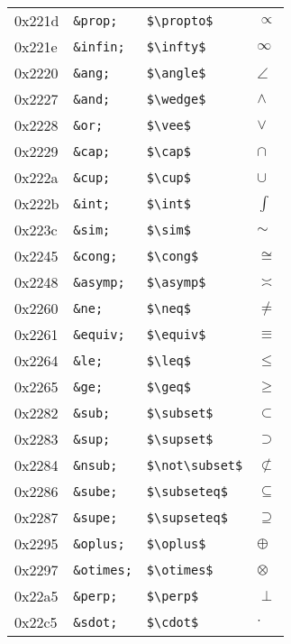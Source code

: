 \documentclass[a4paper,11pt]{article}
\begin{document}
{\begin{xtabular}{|l||l|l|l|}
0x221d&\texttt{\&prop;}&\texttt{\$\textbackslash propto\$}&$\propto$\\ 
0x221e&\texttt{\&infin;}&\texttt{\$\textbackslash infty\$}&$\infty$\\ 
0x2220&\texttt{\&ang;}&\texttt{\$\textbackslash angle\$}&$\angle$\\ 
0x2227&\texttt{\&and;}&\texttt{\$\textbackslash wedge\$}&$\wedge$\\ 
0x2228&\texttt{\&or;}&\texttt{\$\textbackslash vee\$}&$\vee$\\ 
0x2229&\texttt{\&cap;}&\texttt{\$\textbackslash cap\$}&$\cap$\\ 
0x222a&\texttt{\&cup;}&\texttt{\$\textbackslash cup\$}&$\cup$\\ 
0x222b&\texttt{\&int;}&\texttt{\$\textbackslash int\$}&$\int$\\ 
0x223c&\texttt{\&sim;}&\texttt{\$\textbackslash sim\$}&$\sim$\\ 
0x2245&\texttt{\&cong;}&\texttt{\$\textbackslash cong\$}&$\cong$\\ 
0x2248&\texttt{\&asymp;}&\texttt{\$\textbackslash asymp\$}&$\asymp$\\ 
0x2260&\texttt{\&ne;}&\texttt{\$\textbackslash neq\$}&$\neq$\\ 
0x2261&\texttt{\&equiv;}&\texttt{\$\textbackslash equiv\$}&$\equiv$\\ 
0x2264&\texttt{\&le;}&\texttt{\$\textbackslash leq\$}&$\leq$\\ 
0x2265&\texttt{\&ge;}&\texttt{\$\textbackslash geq\$}&$\geq$\\ 
0x2282&\texttt{\&sub;}&\texttt{\$\textbackslash subset\$}&$\subset$\\ 
0x2283&\texttt{\&sup;}&\texttt{\$\textbackslash supset\$}&$\supset$\\ 
0x2284&\texttt{\&nsub;}&\texttt{\$\textbackslash not\textbackslash subset\$}&$\not\subset$\\ 
0x2286&\texttt{\&sube;}&\texttt{\$\textbackslash subseteq\$}&$\subseteq$\\ 
0x2287&\texttt{\&supe;}&\texttt{\$\textbackslash supseteq\$}&$\supseteq$\\ 
0x2295&\texttt{\&oplus;}&\texttt{\$\textbackslash oplus\$}&$\oplus$\\ 
0x2297&\texttt{\&otimes;}&\texttt{\$\textbackslash otimes\$}&$\otimes$\\ 
0x22a5&\texttt{\&perp;}&\texttt{\$\textbackslash perp\$}&$\perp$\\ 
0x22c5&\texttt{\&sdot;}&\texttt{\$\textbackslash cdot\$}&$\cdot$\\ 

\end{xtabular}}
\end{document}
